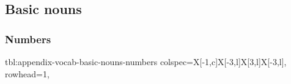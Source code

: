 \documentclass[../nihongo-gakushuu-kyouzai.tex]{subfiles}
\begin{document}
\appendix
\setcounter{section}{2}
\setcounter{subsection}{1}

\subsection{Basic nouns} \label{sec:appendix-basic-nouns}

\subsubsection{Numbers}
{tbl:appendix-vocab-basic-nouns-numbers}  %
{
    colspec={X[-1,c]X[-3,l]X[3,l]X[-3,l]},
    rowhead=1,
}  %
\end{document}
